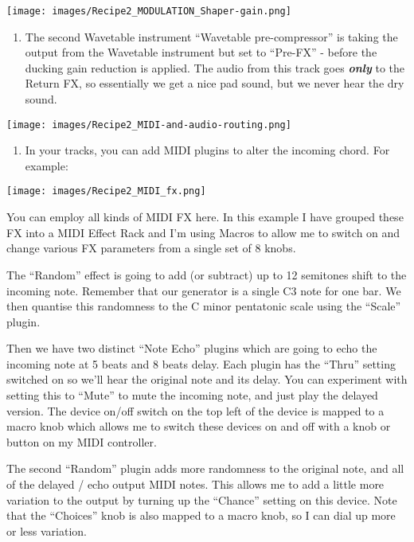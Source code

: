 \documentclass[
  12pt,
  letterpaper,
  oneside,
  open=any]{scrbook}
\providecommand{\tightlist}{%
  \setlength{\itemsep}{0pt}\setlength{\parskip}{0pt}}\usepackage{longtable,booktabs,array}
\begin{document}
\texttt{[image: images/Recipe2\_MODULATION\_Shaper-gain.png]}

\begin{enumerate}
\def\labelenumi{\arabic{enumi}.}
\setcounter{enumi}{4}
\tightlist
\item
  The second Wavetable instrument ``Wavetable pre-compressor'' is taking
  the output from the Wavetable instrument but set to ``Pre-FX'' -
  before the ducking gain reduction is applied. The audio from this
  track goes \textbf{\emph{only}} to the Return FX, so essentially we
  get a nice pad sound, but we never hear the dry sound.
\end{enumerate}

\texttt{[image: images/Recipe2\_MIDI-and-audio-routing.png]}

\begin{enumerate}
\def\labelenumi{\arabic{enumi}.}
\setcounter{enumi}{5}
\tightlist
\item
  In your tracks, you can add MIDI plugins to alter the incoming chord.
  For example:
\end{enumerate}

\texttt{[image: images/Recipe2\_MIDI\_fx.png]}

You can employ all kinds of MIDI FX here. In this example I have grouped
these FX into a MIDI Effect Rack and I'm using Macros to allow me to
switch on and change various FX parameters from a single set of 8 knobs.

The ``Random'' effect is going to add (or subtract) up to 12 semitones
shift to the incoming note. Remember that our generator is a single C3
note for one bar. We then quantise this randomness to the C minor
pentatonic scale using the ``Scale'' plugin.

Then we have two distinct ``Note Echo'' plugins which are going to echo
the incoming note at 5 beats and 8 beats delay. Each plugin has the
``Thru'' setting switched on so we'll hear the original note and its
delay. You can experiment with setting this to ``Mute'' to mute the
incoming note, and just play the delayed version. The device on/off
switch on the top left of the device is mapped to a macro knob which
allows me to switch these devices on and off with a knob or button on my
MIDI controller.

The second ``Random'' plugin adds more randomness to the original note,
and all of the delayed / echo output MIDI notes. This allows me to add a
little more variation to the output by turning up the ``Chance'' setting
on this device. Note that the ``Choices'' knob is also mapped to a macro
knob, so I can dial up more or less variation.
\end{document}
